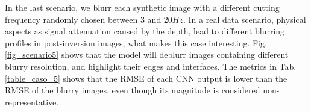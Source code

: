 \documentclass[conference]{IEEEtran}
\begin{document}
In the last scenario, we blurr each synthetic image with a different
cutting frequency randomly chosen between $3$ and $20 Hz$. In a real data scenario,
physical aspects as signal attenuation caused by the depth, lead to
different blurring profiles in post-inversion images, what makes this case interesting.
Fig. \ref{fig_scenario5} shows that the model will deblurr images containing different blurry resolution, and
highlight their edges and interfaces. The metrics in Tab. \ref{table_caso_5} shows that the RMSE of each CNN output is lower than the RMSE of the
blurry images, even though its magnitude is considered non-representative.
\begin{figure}[!t]
\centering
{}

\end{figure}
\end{document}
